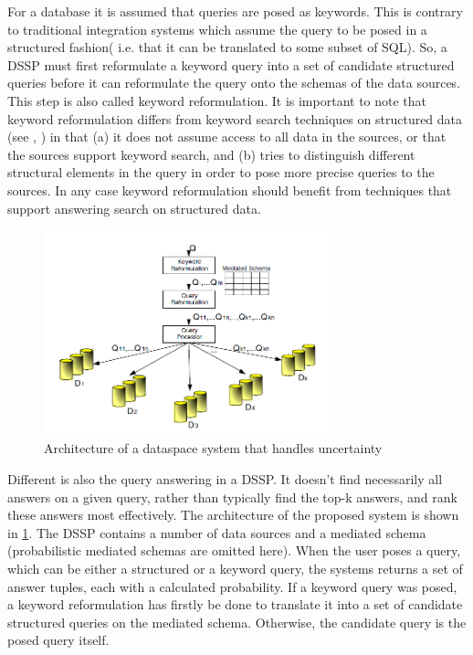 For a database it is assumed that queries are posed as keywords. This is contrary to traditional integration systems which assume the query to be posed in a structured fashion( i.e. that it can be translated to some subset of SQL). So, a DSSP must first reformulate a keyword query into a set of candidate structured queries before it can reformulate the query onto the schemas of the data sources. This step is also called keyword reformulation. 
It is important to note that keyword reformulation differs from keyword search techniques on structured data (see \cite{994693}, \cite{Hristidis:2002:DKS:1287369.1287427}) in that (a) it does not assume access to all data in the sources, or that the sources support keyword search, and (b) tries to distinguish different structural elements in the query in order to pose more precise queries to the sources. In any case keyword reformulation should benefit from techniques that support answering search on structured data.

\begin{figure}[H]
	\begin{center}
		\includegraphics[width=0.75\textwidth]{figures/DataModelingInDSSPs-Figure1.png}
	\end{center}
	\caption{Architecture of a dataspace system that handles uncertainty \cite[p. 124]{DBLP:conf/birthday/SarmaDH09}}
	\label{DataModelingInDSSPsFigure1}
\end{figure}

Different is also the query answering in a DSSP. It doesn't find necessarily all answers on a given query, rather than typically find the top-k answers, and rank these answers most effectively. 
The architecture of the proposed system is shown in \ref{DataModelingInDSSPsFigure1}. The DSSP contains a number of data sources and a mediated schema (probabilistic mediated schemas are omitted here). When the user poses a query, which can be either a structured or a keyword query, the systems returns a set of answer tuples, each with a calculated probability. If a keyword query was posed, a keyword reformulation has firstly be done to translate it into a set of candidate structured queries on the mediated schema. Otherwise, the candidate query is the posed query itself.